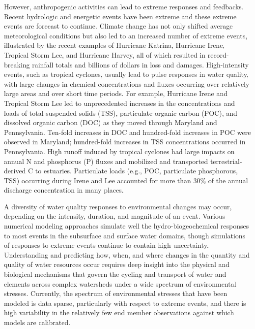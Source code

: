 \documentclass[preprint,review, 12pt]{elsarticle}
\begin{document}
\begin{enumerate}
However, anthropogenic activities can lead to extreme responses and feedbacks. Recent hydrologic and energetic events have been extreme and these extreme events are forecast to continue. Climate change has not only shifted average meteorological conditions but also led to an increased number of extreme events, illustrated by the recent examples of Hurricane Katrina, Hurricane Irene, Tropical Storm Lee, and Hurricane Harvey, all of which resulted in record-breaking rainfall totals and billions of dollars in loss and damages.  High-intensity events, such as tropical cyclones, usually lead to pulse responses in water quality, with large changes in chemical concentrations and fluxes occurring over relatively large areas and over short time periods. For example, Hurricane Irene and Tropical Storm Lee led to unprecedented increases in the concentrations and loads of total suspended solids (TSS), particulate organic carbon (POC), and dissolved organic carbon (DOC) as they moved through Maryland and Pennsylvania. Ten-fold increases in DOC and hundred-fold increases in POC were observed in Maryland; hundred-fold increases in TSS concentrations occurred in Pennsylvania. High runoff induced by tropical cyclones had large impacts on annual N and phosphorus (P) fluxes and mobilized and transported terrestrial-derived C to estuaries. Particulate loads (e.g., POC, particulate phosphorous, TSS) occurring during Irene and Lee accounted for more than 30\% of the annual discharge concentration in many places.

A diversity of water quality responses to environmental changes may occur, depending on the intensity, duration, and magnitude of an event. Various numerical modeling approaches simulate well the hydro-biogeochemical responses to most events in the subsurface and surface water domains, though  simulations of responses to extreme events continue to contain high uncertainty. Understanding and predicting how, when, and where changes in the quantity and quality of water resources occur requires deep insight into the physical and biological mechanisms that govern the cycling and transport of water and elements across complex watersheds under a wide spectrum of environmental stresses. Currently, the spectrum of environmental stresses that have been modeled is data sparse, particularly with respect to extreme events, and there is high variability in the relatively few end member observations against which models are calibrated. 


\end{enumerate}
\end{document}
